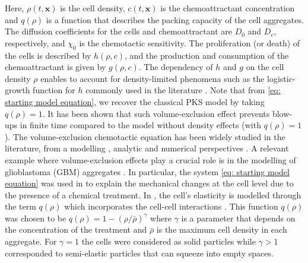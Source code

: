 \documentclass[review,onefignum,onetabnum]{siamart220329}
\begin{document}
Here, $\rho(t,\mathbf{x})$ is the cell density, $c(t,\mathbf{x})$ is the chemoattractant concentration and  $q(\rho)$ is a function that describes the packing capacity of the cell aggregates.  The diffusion coefficients for the cells and chemoattractant are $D_0$ and $D_c$, respectively, and $\chi_0$ is the chemotactic sensitivity. The proliferation (or death) of the cells is described by $h(\rho,c)$,  and the production and consumption of the chemoattractant is given by $g(\rho,c)$. The dependency of $h$ and $g$ on the cell density $\rho$ enables to account for density-limited phenomena such as the logistic-growth function for $h$ commonly used in the literature \cite{murray2002introduction,murray2003mathematical}. Note that from \eqref{eq: starting model equation}, we recover the classical PKS model by taking $q(\rho) = 1$.  It has been shown \cite{wrzosek2010volume,calvez2006volume,zheng2015boundedness} that such volume-exclusion effect prevents blow-ups in finite time compared to the model without density effects (with $q(\rho) = 1$). The volume-exclusion chemotactic equation has been widely studied in the literature, from a modelling \cite{painter2002volume,wang2010chemotaxis}, analytic \cite{wrzosek2010volume,han2017pattern,ma2012stationary,dolak2005keller} and numerical perspectives \cite{ibrahim2014efficacy}. A relevant example where volume-exclusion effects play a crucial role is in the modelling of glioblastoma (GBM) aggregates  \cite{Vital2011}. In particular, the  system \cref{eq: starting model equation} was used in \cite{almeida2020treatment} to explain the mechanical changes at the cell level  due to the presence of a chemical treatment. In \cite{almeida2020treatment}, the cell's elasticity is modelled through the term $q(\rho)$ which incorporates the cell-cell interactions \cite{wang2007classical}. This function $q(\rho)$ was chosen to be $q(\rho)=1-(\rho/\bar{\rho})^\gamma$ where $\gamma$ is a parameter that depends on the concentration of the treatment and $\bar{\rho}$ is the maximum cell density in each aggregate. For $\gamma=1$ the cells were considered as solid particles while {$\gamma>1$  corresponded to semi-elastic particles} that can squeeze into empty spaces. 
\end{document}
